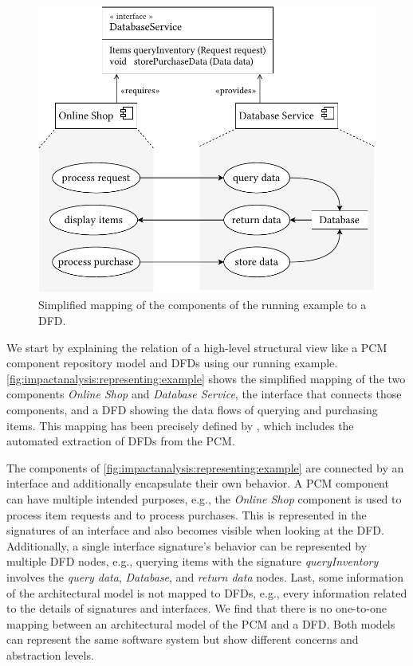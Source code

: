 \begin{figure}
    \centering
    \includegraphics[width=0.8\linewidth]{figures/chapter6/mapping-example.pdf}
    \caption{Simplified mapping of the components of the running example to a \acf*{DFD}.}
    \label{fig:impactanalysis:representing:example}
\end{figure}

We start by explaining the relation of a high-level structural view like a \ac{PCM} component repository model and \acp{DFD} using our running example.
\autoref{fig:impactanalysis:representing:example} shows the simplified mapping of the two components \emph{Online Shop} and \emph{Database Service}, the interface that connects those components, and a \ac{DFD} showing the data flows of querying and purchasing items.
This mapping has been precisely defined by \textcite{seifermann_architectural_2022}, which includes the automated extraction of \acp{DFD} from the \ac{PCM}.

The components of \autoref{fig:impactanalysis:representing:example} are connected by an interface and additionally encapsulate their own behavior.
A \ac{PCM} component can have multiple intended purposes, e.g., the \emph{Online Shop} component is used to process item requests and to process purchases.
This is represented in the signatures of an interface and also becomes visible when looking at the \ac{DFD}.
Additionally, a single interface signature's behavior can be represented by multiple \ac{DFD} nodes, e.g., querying items with the signature \emph{queryInventory} involves the \emph{query data}, \emph{Database}, and \emph{return data} nodes.
Last, some information of the architectural model is not mapped to \acp{DFD}, e.g., every information related to the details of signatures and interfaces.
We find that there is no one-to-one mapping between an architectural model of the \ac{PCM} and a \ac{DFD}.
Both models can represent the same software system but show different concerns and abstraction levels.


